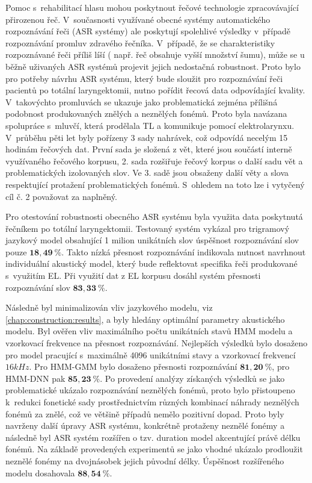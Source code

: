 Pomoc s~rehabilitací hlasu mohou poskytnout řečové technologie zpracovávající přirozenou řeč. V~současnosti využívané obecné systémy automatického rozpoznávání řeči (ASR systémy) ale poskytují spolehlivé výsledky v~případě rozpoznávání promluv zdravého řečníka. V~případě, že se charakteristiky rozpoznávané řeči příliš líší ( např. řeč obsahuje vyšší množství šumu), může se u běžně uživaných ASR systémů projevit jejich nedostačná robustnost. Proto bylo pro potřeby návrhu ASR systému, který bude sloužit pro rozpoznávání řeči pacientů po totální laryngektomii, nutno pořídit řecová data odpovídající kvality. V~takovýchto promluvách se ukazuje jako problematická zejména přílišná podobnost produkovaných znělých a neznělých fonémů. Proto byla navázana spolupráce s~mluvčí, která prodělala TL a komunikuje pomocí elektrolarynxu. V~průběhu pěti let byly pořízeny 3 sady nahrávek, což odpovídá necelým 15 hodinám řečových dat. První sada je složená z vět, které jsou součástí interně využívaného řečového korpusu, 2. sada rozšiřuje řečový korpus o další sadu vět a problematických izolovaných slov. Ve 3. sadě jsou obsaženy další věty a slova respektující protažení problematických fonémů.
S~ohledem na toto lze i vytyčený cíl č. 2 považovat za naplněný.

Pro otestování robustnosti obecného ASR systému byla využita data poskytnutá řečníkem po totální laryngektomii. Testovaný systém vykázal pro trigramový jazykový model obsahující 1 milion unikátních slov úspěšnost rozpoznávání slov pouze $\boldsymbol{18,49~\%}$. Takto nízká přesnost rozpoznávání indikovala nutnost navrhnout individuální akustický model, který bude reflektovat specifika řeči produkované s~využitím EL. Při využití dat z EL korpusu dosáhl systém přesnosti rozpoznávání slov $\boldsymbol{83,33~\%}$.

Následně byl minimalizován vliv jazykového modelu, viz \ref{chap:construction:results}, a byly hledány optimální parametry akustického modelu. Byl ověřen vliv maximálního počtu unikátních stavů HMM modelu a vzorkovací frekvence na přesnost rozpoznávání. Nejlepších výsledků bylo dosaženo pro model pracující s~maximálně 4096 unikátními stavy a vzorkovací frekvencí $16 kHz$. Pro HMM-GMM bylo dosaženo přesnosti rozpoznávání $\boldsymbol{81,20~\%}$, pro HMM-DNN pak $\boldsymbol{85,23~\%}$. Po provedení analýzy získaných výsledků se jako problematické ukázalo rozpoznávání neznělých fonémů, proto bylo přistoupeno  k~redukci fonetické sady prostřednictvím různých kombinací náhrady neznělých fonémů za znělé, což ve většině případů nemělo pozitivní dopad. Proto byly navrženy další úpravy ASR systému, konkrétně protaženy neznělé fonémy a následně byl ASR systém rozšířen o tzv. duration model akcentující právě délku fonémů. Na základě provedených experimentů se jako vhodné ukázalo prodloužit neznělé fonémy na dvojnásobek jejich původní délky. Úspěšnost rozšířeného modelu dosahovala $\boldsymbol{88,54~\%}$.

